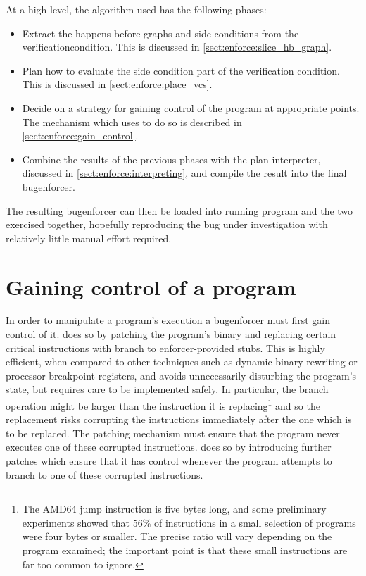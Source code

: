 At a high level, the algorithm used has the following phases:
\begin{itemize}
\item
  Extract the happens-before graphs and side conditions from the
  \gls{verificationcondition}.  This is discussed in
  \autoref{sect:enforce:slice_hb_graph}.
\item
  Plan how to evaluate the side condition part of the verification
  condition.  This is discussed in \autoref{sect:enforce:place_vcs}.
\item
  Decide on a strategy for gaining control of the program at
  appropriate points.  The mechanism which {\technique} uses to do so
  is described in \autoref{sect:enforce:gain_control}.
\item
  Combine the results of the previous phases with the plan
  interpreter, discussed in \autoref{sect:enforce:interpreting}, and
  compile the result into the final \gls{bugenforcer}.
\end{itemize}
The resulting \gls{bugenforcer} can then be loaded into running
program and the two exercised together, hopefully reproducing the bug
under investigation with relatively little manual effort required.

\section{Gaining control of a program}
\label{sect:enforce:gain_control}

In order to manipulate a program's execution a \gls{bugenforcer} must
first gain control of it.  {\Implementation} does so by patching the
program's binary and replacing certain critical instructions with
branch to enforcer-provided stubs.  This is highly efficient, when
compared to other techniques such as dynamic binary
rewriting\cite{Nethercote2007,Luk2005} or processor breakpoint
registers\cite[Chapter 16.2: Debug Registers]{Intel2009}, and avoids
unnecessarily disturbing the program's state, but requires care to be
implemented safely.  In particular, the branch operation might be
larger than the instruction it is replacing\footnote{The AMD64 jump
  instruction is five bytes long, and some preliminary experiments
  showed that 56\% of instructions in a small selection of programs
  were four bytes or smaller.  The precise ratio will vary depending
  on the program examined; the important point is that these small
  instructions are far too common to ignore.} and so the replacement
risks corrupting the instructions immediately after the one which is
to be replaced.  The patching mechanism must ensure that the program
never executes one of these corrupted instructions.  {\Implementation}
does so by introducing further patches which ensure that it has
control whenever the program attempts to branch to one of these
corrupted instructions.

